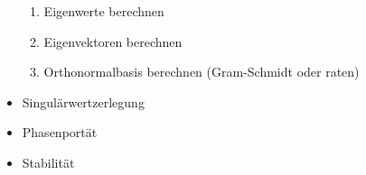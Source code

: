 \documentclass[8pt,a4paper]{scrartcl}
\begin{document}
\begin{multicols}{2}
\begin{itemize}
		\begin{enumerate}
			\item{Eigenwerte berechnen}
			\item{Eigenvektoren berechnen}
			\item{Orthonormalbasis berechnen (Gram-Schmidt oder raten)}
		\end{enumerate}
	\item{Singulärwertzerlegung}
	\item{Phasenportät}
	\item{Stabilität}
\end{itemize}

\end{multicols}
\end{document}
